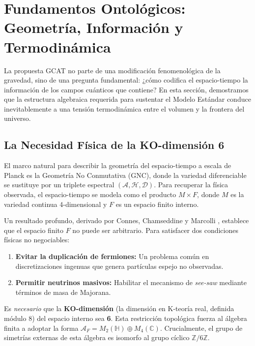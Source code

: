 \documentclass[12pt, a4paper]{article}
\theoremstyle{plain}
\theoremstyle{definition}
\begin{document}
\section{Fundamentos Ontológicos: Geometría, Información y Termodinámica}
\label{sec:fundamentos}

La propuesta GCAT no parte de una modificación fenomenológica de la gravedad, sino de una pregunta fundamental: ¿cómo codifica el espacio-tiempo la información de los campos cuánticos que contiene? En esta sección, demostramos que la estructura algebraica requerida para sustentar el Modelo Estándar conduce inevitablemente a una tensión termodinámica entre el volumen y la frontera del universo.

\subsection{La Necesidad Física de la KO-dimensión 6}

El marco natural para describir la geometría del espacio-tiempo a escala de Planck es la Geometría No Conmutativa (GNC), donde la variedad diferenciable se sustituye por un triplete espectral $(\mathcal{A}, \mathcal{H}, \mathcal{D})$. Para recuperar la física observada, el espacio-tiempo se modela como el producto $M \times F$, donde $M$ es la variedad continua 4-dimensional y $F$ es un espacio finito interno.

Un resultado profundo, derivado por Connes, Chamseddine y Marcolli \cite{Connes2008, Chamseddine2012}, establece que el espacio finito $F$ no puede ser arbitrario. Para satisfacer dos condiciones físicas no negociables:
\begin{enumerate}
    \item \textbf{Evitar la duplicación de fermiones:} Un problema común en discretizaciones ingenuas que genera partículas espejo no observadas.
    \item \textbf{Permitir neutrinos masivos:} Habilitar el mecanismo de \textit{see-saw} mediante términos de masa de Majorana.
\end{enumerate}

Es \textit{necesario} que la \textbf{KO-dimensión} (la dimensión en K-teoría real, definida módulo 8) del espacio interno sea \textbf{6}. Esta restricción topológica fuerza al álgebra finita a adoptar la forma $\mathcal{A}_F = M_2(\mathbb{H}) \oplus M_4(\mathbb{C})$. Crucialmente, el grupo de simetrías externas de esta álgebra es isomorfo al grupo cíclico $\mathbb{Z}/6\mathbb{Z}$.
\end{document}

